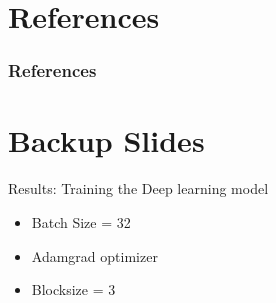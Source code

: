\documentclass{beamer}
\begin{document}
\backmatter

\section*{References}
\begin{frame}[t,allowframebreaks]
    \frametitle{References}
    \small \printbibliography[heading=none]
\end{frame}
\section*{Backup Slides}

\begin{frame}{Results: Training the Deep learning model}
\begin{minipage}{\textwidth}
    \begin{minipage}{0.66\textwidth}
        \begin{itemize}
            \item Batch Size = 32
            \item Adamgrad optimizer
            \item Blocksize = 3
        \end{itemize}
        

\end{minipage}
\end{minipage}
\end{frame}
\end{document}
